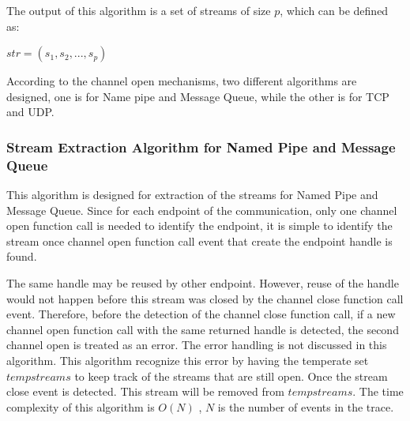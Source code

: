 The output of this algorithm is a set of streams of size $p$, which can be defined as:

$str = (s_1, s_2, ..., s_p)$

According to the channel open mechanisms, two different algorithms are designed, one is for Name pipe and Message Queue, while the other is for TCP and UDP. 

\subsubsection{Stream Extraction Algorithm for Named Pipe and Message Queue}
This algorithm is designed for extraction of the streams for Named Pipe and Message Queue. Since for each endpoint of the communication, only one channel open function call is needed to identify the endpoint, it is simple to identify the stream once channel open function call event that create the endpoint handle is found. 

The same handle may be reused by other endpoint. However, reuse of the handle would not happen before this stream was closed by the channel close function call event. Therefore, before the detection of the channel close function call, if a new channel open function call with the same returned handle is detected, the second channel open is treated as an error. The error handling is not discussed in this algorithm. This algorithm recognize this error by having the temperate set $tempstreams$ to keep track of the streams that are still open. Once the stream close event is detected. This stream will be removed from $tempstreams$. The time complexity of this algorithm is $O(N)$ , $N$ is the number of events in the trace.

